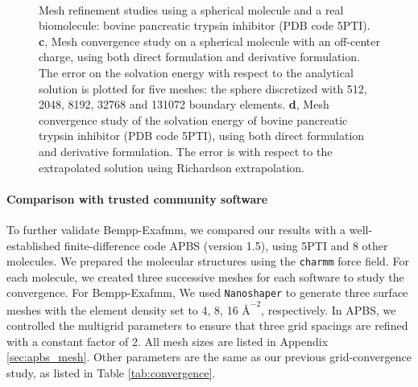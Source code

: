 \begin{figure*}
        \centering
     \quad
     \\
    \caption{Mesh refinement studies using a spherical molecule and a real biomolecule: bovine pancreatic trypsin inhibitor (PDB code 5PTI).
    \textbf{c}, Mesh convergence study on a spherical molecule with an off-center charge, using both direct formulation and derivative formulation. The error on the solvation energy with respect to the analytical solution is plotted for five meshes:
    the sphere discretized with 512, 2048, 8192, 32768 and 131072 boundary elements.
    \textbf{d}, Mesh convergence study of the solvation energy of bovine pancreatic trypsin inhibitor (PDB code 5PTI), using both direct formulation and derivative formulation.
    The error is with respect to the extrapolated solution using Richardson extrapolation.
    }
\end{figure*}

\paragraph{Comparison with trusted community software} \label{comparison}
To further validate Bempp-Exafmm, we compared our results with a well-established finite-difference code APBS (version 1.5), using 5PTI and 8 other molecules.
We prepared the molecular structures using the \texttt{charmm} force field.
For each molecule, we created three successive meshes for each software to study the convergence.
For Bempp-Exafmm, We used \texttt{Nanoshaper} to generate three surface meshes with the element density set to 4, 8, 16 ${\si{\angstrom}}^{-2}$, respectively.
In APBS, we controlled the multigrid parameters to ensure that three grid spacings are refined with a constant factor of 2.
All mesh sizes are listed in Appendix \ref{sec:apbs_mesh}.
Other parameters are the same as our previous grid-convergence study, as listed in Table \ref{tab:convergence}.

